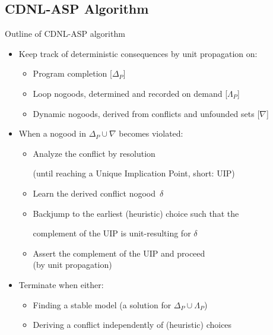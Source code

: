 \subsection{CDNL-ASP Algorithm}
\begin{frame}{Outline of CDNL-ASP algorithm}
\begin{itemize}
\item Keep track of deterministic consequences by unit propagation on:
  \begin{itemize}
  \item Program completion \hfill [$\Delta_P$]%
  \item Loop nogoods, determined and recorded on demand \hfill [$\Lambda_P$]%
  \item Dynamic nogoods, derived from conflicts and unfounded sets \hfill[$\nabla$]%
  \end{itemize}
\pause
\item When a nogood in $\Delta_P\cup\nabla$ becomes \alert<2>{violated}:
  \begin{itemize}
  \item \alert<2>{Analyze} the conflict by resolution
    \par
    (until reaching a {Unique Implication Point}, short: UIP)
  \item \alert<2>{Learn} the derived conflict nogood~$\delta$
  \item \alert<2>{Backjump} to the earliest (heuristic) choice such that
        the\par complement of the UIP is unit-resulting for $\delta$
  \item \alert<2>{Assert} the complement of the UIP and proceed\\
        (by unit propagation)
  \end{itemize}
\pause
\item Terminate when either:
  \begin{itemize}
  \item Finding a stable model (a solution for $\Delta_P\cup\Lambda_P$)
  \item Deriving a conflict independently of (heuristic) choices
  \end{itemize}
\end{itemize}
\end{frame}

